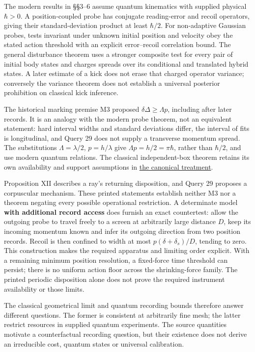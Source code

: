 \documentclass[11pt,a4paper]{article}
\begin{document}
The modern results in §§3--6 assume quantum kinematics with supplied
physical \(\hbar>0\). A position-coupled probe has conjugate
reading-error and recoil operators, giving their standard-deviation
product at least \(\hbar/2\). For non-adaptive Gaussian probes, tests
invariant under unknown initial position and velocity obey the stated
action threshold with an explicit error--recoil correlation bound. The
general disturbance theorem uses a stronger composite test for every
pair of initial body states and charges spreads over its conditional and
translated hybrid states. A later estimate of a kick does not erase that
charged operator variance; conversely the variance theorem does not
establish a universal posterior prohibition on classical kick inference.

The historical marking premise M3 proposed \(\delta\Delta\ge\Lambda p\),
including after later records. It is an analogy with the modern probe
theorem, not an equivalent statement: hard interval widths and standard
deviations differ, the interval of fits is longitudinal, and Query 29
does not supply a transverse momentum spread. The substitutions
\(\Lambda=\lambda/2\), \(p=h/\lambda\) give \(\Lambda p=h/2=\pi\hbar\),
rather than \(\hbar/2\), and use modern quantum relations. The classical
independent-box theorem retains its own availability and support
assumptions in
\href{mark-cost-and-statistical-floor.md\#geometry-and-the-independent-box-record-model}{the
canonical treatment}.

Proposition XII describes a ray's returning disposition, and Query 29
proposes a corpuscular mechanism. These printed statements establish
neither M3 nor a theorem negating every possible operational
restriction. A determinate model \textbf{with additional record access}
does furnish an exact countertest: allow the outgoing probe to travel
freely to a screen at arbitrarily large distance \(D\), keep its
incoming momentum known and infer its outgoing direction from two
position records. Recoil is then confined to width at most
\(p(\delta+\delta_s)/D\), tending to zero. This construction makes the
required apparatus and limiting order explicit. With a remaining minimum
position resolution, a fixed-force time threshold can persist; there is
no uniform action floor across the shrinking-force family. The printed
periodic disposition alone does not prove the required instrument
availability or those limits.

The classical geometrical limit and quantum recording bounds therefore
answer different questions. The former is consistent at arbitrarily fine
mesh; the latter restrict resources in supplied quantum experiments. The
source quantities motivate a counterfactual recording question, but
their existence does not derive an irreducible cost, quantum states or
universal calibration.
\end{document}
